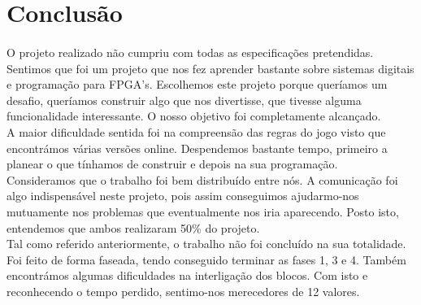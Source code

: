 \documentclass[a4paper, 11pt, oneside]{report}
\begin{document}
\section{Conclusão}

\paragraph{} O projeto realizado não cumpriu com todas as especificações pretendidas. Sentimos que foi um projeto que nos fez aprender bastante sobre sistemas digitais e programação para FPGA's. Escolhemos este projeto porque queríamos um desafio, queríamos construir algo que nos divertisse, que tivesse alguma funcionalidade interessante. O nosso objetivo foi completamente alcançado. \\
\indent A maior dificuldade sentida foi na compreensão das regras do jogo visto que encontrámos várias versões online. Despendemos bastante tempo, primeiro a planear o que tínhamos de construir e depois na sua programação. \\
\indent Consideramos que o trabalho foi bem distribuído entre nós. A comunicação foi algo indispensável neste projeto, pois assim conseguimos ajudarmo-nos mutuamente nos problemas que eventualmente nos iria aparecendo. Posto isto, entendemos que ambos realizaram 50\% do projeto. \\
\indent Tal como referido anteriormente, o trabalho não foi concluído na sua totalidade. Foi feito de forma faseada, tendo conseguido terminar as fases 1, 3 e 4. Também encontrámos algumas dificuldades na interligação dos blocos. Com isto e reconhecendo o tempo perdido, sentimo-nos merecedores de 12 valores.
\end{document}
